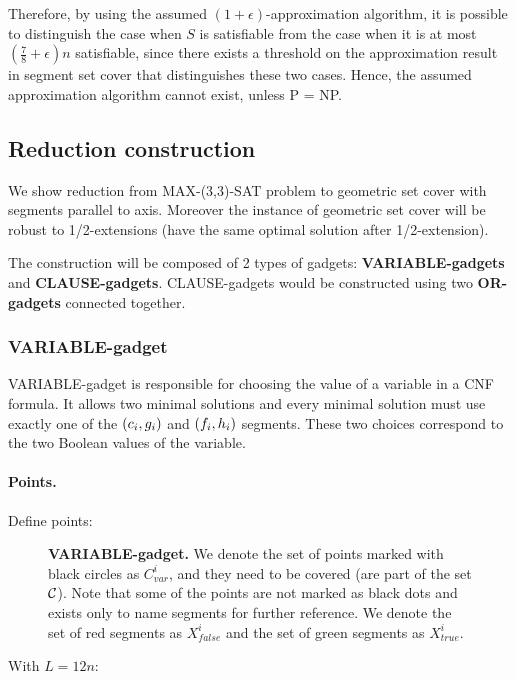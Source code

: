 Therefore, by using the assumed $(1+\epsilon)$-approximation
algorithm,
it is possible to distinguish the case when
$S$ is satisfiable from the case when it is
at most $(\frac{7}{8} + \epsilon)n$ satisfiable,
since there exists a threshold on the
approximation result in segment set cover that distinguishes
these two cases.
Hence, the assumed approximation algorithm cannot exist, unless P = NP.

\subsection{Reduction construction}
We show reduction from MAX-(3,3)-SAT problem
to geometric set cover with segments
parallel to axis. Moreover the instance
of geometric set cover will be robust
to 1/2-extensions (have the same optimal solution
after 1/2-extension).

The construction will be composed of 2 types of gadgets:
\textbf{VARIABLE-gadgets} and \textbf{CLAUSE-gadgets}.
CLAUSE-gadgets would be constructed using two \textbf{OR-gadgets}
connected together.


\subsubsection{VARIABLE-gadget}

VARIABLE-gadget is responsible for choosing the value of a variable
in a CNF formula. It allows two minimal solutions
and every minimal solution must use exactly one of the
$(c_i, g_i)$ and $(f_i, h_i)$
segments. These two choices correspond to the two Boolean values of the variable.

\paragraph{Points.}

Define points:
\begin{figure}[h]
\centering
\def\svgwidth{0.5\columnwidth}

\caption{\textbf{VARIABLE-gadget.}
We denote the set of points marked with black circles as $C_{var}^i$,
and they need to be covered (are part of the set $\mathcal{C}$).
Note that some of the points are not marked as black dots
and exists only to name segments for further reference.
We denote the set of red segments as $X_{false}^i$
and the set of green segments as $X_{true}^i$.}
\label{fig:apx_choose_variable}
\end{figure}

With $L = 12n$:

